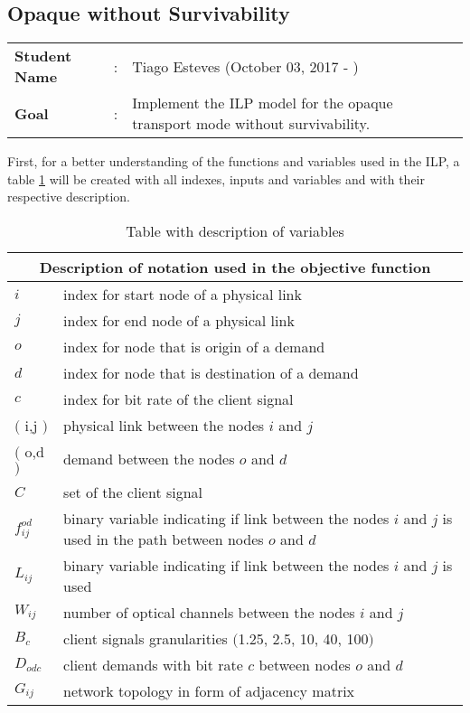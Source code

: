 \clearpage

\subsection{Opaque without Survivability}\label{ILP_Opaque_Survivability}
\begin{tcolorbox}	
\begin{tabular}{p{2.75cm} p{0.2cm} p{10.5cm}} 	
\textbf{Student Name}  &:& Tiago Esteves    (October 03, 2017 - )\\
\textbf{Goal}          &:& Implement the ILP model for the opaque transport mode without survivability.
\end{tabular}
\end{tcolorbox}
\vspace{11pt}

First, for a better understanding of the functions and variables used in the ILP, a table \ref{description_opaque} will be created with all indexes, inputs and variables and with their respective description.\\

\begin{table}[h!]
\centering
\begin{tabular}{ |p{1cm}||p{13cm}|}
 \hline
 \multicolumn{2}{|c|}{Description of notation used in the objective function} \\
 \hline
 \hline
 $i$ & index for start node of a physical link \\
 $j$ & index for end node of a physical link \\
 $o$ & index for node that is origin of a demand \\
 $d$ & index for node that is destination of a demand \\
 $c$ & index for bit rate of the client signal \\
 $($ i,j $)$ & physical link between the nodes $i$ and $j$ \\
 $($ o,d $)$ & demand between the nodes $o$ and $d$ \\
 $C$ & set of the client signal \\
 $f_{ij}^{od}$ & binary variable indicating if link between the nodes $i$ and $j$ is used in the path between nodes $o$ and $d$ \\
 $L_{ij}$ & binary variable indicating if link between the nodes $i$ and $j$ is used \\
 $W_{ij}$ & number of optical channels between the nodes $i$ and $j$\\
 $B_c $ & client signals granularities $($1.25, 2.5, 10, 40, 100$)$ \\
 $D_{odc}$ & client demands with bit rate $c$ between nodes $o$ and $d$ \\
 $G_{ij}$ & network topology in form of adjacency matrix \\
 \hline
\end{tabular}
\caption{Table with description of variables}
\label{description_opaque}
\end{table}


